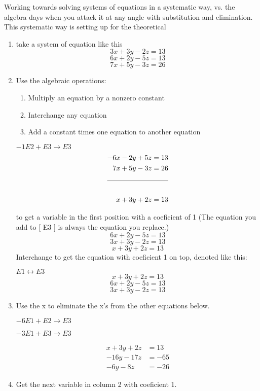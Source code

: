 Working towards solving systems of equations in a systematic way, vs. the algebra days when
you attack it at any angle with substitution and elimination. This systematic way is setting up
for the theoretical
\begin{example}[1]

\begin{enumerate}
	\item take a system of equation like this
		\[
			3x + 3y -2z = 13
		\]
		\[
			6x + 2y -5z = 13
			\] \[
			7x + 5y - 3z = 26
		\]
	\item Use the algebraic operations:
		\begin{enumerate}
			\item Multiply an equation by a nonzero constant
			\item  Interchange any equation
			\item Add a constant times one equation to another equation
		\end{enumerate}
		$-1  E2 + E3 \to E3$
		\begin{align*}
			-6x - 2y + 5z &= 13 \\
			7x + 5y - 3z &= 26\\
			\cline{1-2} \\
			x + 3y + 2z &= 13
		\end{align*}


		to get a variable in the first position with a coeficient of 1 (The equation you add to [ E3 ]
		is always the equation you replace.)
		\[
			6x + 2y - 5z = 13
			\] \[
			3x + 3y - 2z = 13
			\]	\[
			x + 3y + 2z = 13
		\]
		Interchange to get the equation with coeficient 1 on top, denoted like this:

		$E 1 \leftrightarrow E 3$
		\[
			x + 3y + 2z = 13
			\]\[
			6x + 2y - 5z = 13
			\]\[
			3x + 3y - 2z = 13
		\]
	\item Use the x to eliminate the x's from the other equations below.

		$-6  E 1 + E 2 \to E 3$

		$-3 E 1 + E 3 \to E 3$

		\begin{align*}
			x + 3y + 2z &= 13 \\
			-16y - 17z &= -65 \\
			-6y - 8z &= -26
		\end{align*}

	\item Get the next variable in column 2 with coeficient 1.


\end{enumerate}
\end{example}
